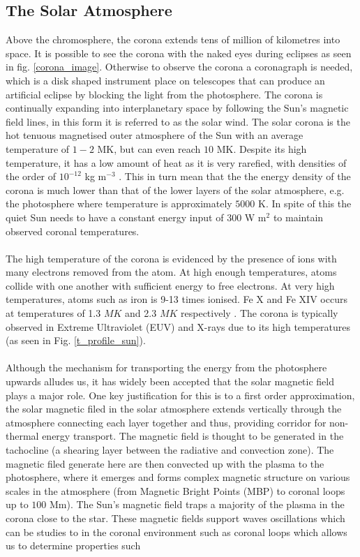 \documentclass[12pt]{ociamthesis}
\begin{document}
\subsection{The Solar Atmosphere}
\label{subsec:interior}
Above the chromosphere, the corona extends tens of million of kilometres into space. It is possible to see the corona with the naked eyes during eclipses as seen in fig. \ref{corona_image}. Otherwise to observe the corona a coronagraph is needed, which is a disk shaped instrument place on telescopes that can produce an artificial eclipse by blocking the light from the photosphere. The corona is continually expanding into interplanetary space by following the Sun's magnetic field lines, in this form it is referred to as the solar wind. The solar corona is the hot tenuous magnetised outer atmosphere of the Sun with an average temperature of $1-2$ MK, but can even reach $10$ MK. Despite its high temperature, it has a low amount of heat as it is very rarefied, with densities of the order of $10^{-12}$ kg m$^{-3}$ \citep{priest2014magnetohydrodynamics}. This in turn mean that the the energy density of the corona is much lower than that of the lower layers of the solar atmosphere, e.g. the photosphere where temperature is approximately $5000$ K. In spite of this the quiet Sun needs to have a constant energy input of $300$ W m$^2$ \citep{priest2014magnetohydrodynamics} to maintain observed coronal temperatures. \\ \\ The high temperature of the corona is evidenced by the presence of ions with many electrons removed from the atom. At high enough temperatures, atoms collide with one another with sufficient energy to free electrons. At very high temperatures, atoms such as iron is 9-13 times ionised. Fe X and Fe XIV occurs at temperatures of 1.3 $MK$ and 2.3  $MK$ respectively \citep{narayanan2014introduction}. The corona is typically observed in Extreme Ultraviolet (EUV) and X-rays due to its high temperatures (as seen in Fig. \ref{t_profile_sun}). \\ \\ Although the mechanism for transporting the energy from the photosphere upwards alludes us, it has widely been accepted that the solar magnetic field plays a major role. One key justification for this is to a first order approximation, the solar magnetic filed in the solar atmosphere extends vertically through the atmosphere connecting each layer together and thus, providing corridor for non-thermal energy transport. The magnetic field is thought to be generated in the tachocline (a shearing layer between the radiative and convection zone). The magnetic filed generate here are then convected up with the plasma to the photosphere, where it emerges and forms complex magnetic structure on various scales in the atmosphere (from Magnetic Bright Points (MBP) to coronal loops up to $100$ Mm). The Sun's magnetic field traps a majority of the plasma in the corona close to the star. These magnetic fields support waves oscillations which can be studies to in the coronal environment such as coronal loops which allows us to determine properties such 
\end{document}
